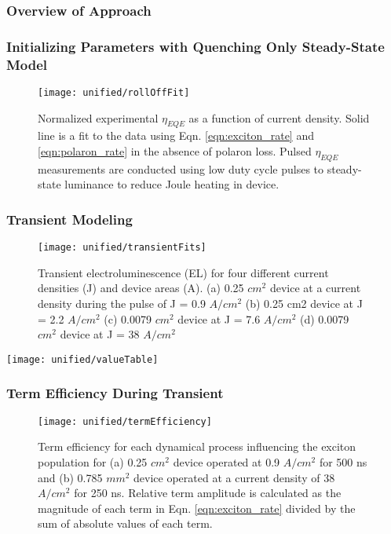 \documentclass[../thesis.tex]{subfiles}
\begin{document}
\subsubsection{Overview of Approach}
\subsubsection{Initializing Parameters with Quenching Only Steady-State Model}
\begin{figure}[ht]
\texttt{[image: unified/rollOffFit]}
\caption{Normalized experimental $\eta_{EQE}$ as a function of current density.  Solid line is a fit to the data using Eqn. \ref{eqn:exciton_rate} and \ref{eqn:polaron_rate} in the absence of polaron loss.  Pulsed $\eta_{EQE}$ measurements are conducted using low duty cycle pulses to steady-state luminance to reduce Joule heating in device.}
\label{fig:rollOffFit}
\end{figure}
\subsubsection{Transient Modeling}
\begin{figure}[ht]
\centering
\texttt{[image: unified/transientFits]}
\caption{Transient electroluminescence (EL) for four different current densities (J) and device areas (A). (a) 0.25 $cm^2$ device at a current density during the pulse of J = 0.9 $A/cm^2$ (b) 0.25 cm2
device at J = 2.2 $A/cm^2$ (c) 0.0079 $cm^2$ device at J = 7.6 $A/cm^2$ (d) 0.0079 $cm^2$ device at J = 38 $A/cm^2$}
\label{fig:transientFits}
\end{figure}
\texttt{[image: unified/valueTable]}
\subsubsection{Term Efficiency During Transient}


\begin{figure}[ht]
\centering
\texttt{[image: unified/termEfficiency]}
\caption{Term efficiency for each dynamical process influencing the exciton population for (a) 0.25 $cm^2$ device operated at 0.9 $A/cm^2$ for 500 ns and (b) 0.785 $mm^2$ device operated at a current density of 38 $A/cm^2$ for 250 ns. Relative term amplitude is calculated as the magnitude of each term in Eqn. \ref{eqn:exciton_rate} divided by the sum of absolute values of each term.}
\label{fig:termEfficiency}
\end{figure}
\end{document}
